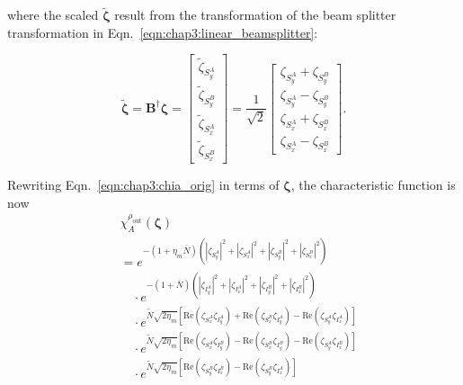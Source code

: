 \documentclass[aps,twocolumn,secnumarabic,amsmath,amssymb,pra,groupedaddress,
showpacs, showkeys,draft]{revtex4-1}
\newcommand{\pna}[1]{\left(#1\right)}
\newcommand{\pnb}[1]{\left[#1\right]}
\newcommand{\eqn}[1]{
\begin{equation}
	#1
\end{equation}
}
\begin{document}
where the scaled $\tilde{\bm{\zeta}}$ result from the transformation of the
beam splitter transformation in Eqn.~\ref{eqn:chap3:linear_beamsplitter}:
\eqn{
\tilde{\bm{\zeta}}=\mathbf{B}^{\dagger}\bm{\zeta}=\left[
\begin{array}{c}
	\tilde{\zeta}_{S_y^A} \\
	\tilde{\zeta}_{S_y^B} \\
	\tilde{\zeta}_{S_x^A} \\
	\tilde{\zeta}_{S_x^B}
\end{array}
\right]=\frac{1}{\sqrt{2}}
\left[
\begin{array}{c}
	\zeta_{S_y^A} + \zeta_{S_y^B} \\
	\zeta_{S_y^A} - \zeta_{S_y^B} \\
	\zeta_{S_x^A} + \zeta_{S_x^B}\\
	\zeta_{S_x^A} - \zeta_{S_x^B}
\end{array}
\right].\label{eq:scaled_vars}
}
Rewriting Eqn.~\ref{eqn:chap3:chia_orig} in terms of $\bm{\zeta}$, the
characteristic function is now
\begin{align}
  & \chi_A^{\rho_{\textrm{out}}}\pna{\bm{\zeta}} \nonumber \\
&  = e^{-\pna{1+\eta_{m}\bar{N}}\pna{|\zeta_{S_y^A}|^2+|\zeta_{S_x^A}|^2+|\zeta_{S_y^B}|^2+|\zeta_{S_x^B}|^2}}
  \nonumber \\
&  \quad\cdot
e^{-\pna{1+\bar{N}}\pna{|\zeta_{I_y^A}|^2+|\zeta_{I_x^A}|^2+|\zeta_{I_y^B}|^2+|\zeta_{I_x^B}|^2}}
\nonumber \\
&  \quad\cdot e^{\tilde{N}\sqrt{2\eta_{m}}\pnb{\textrm{Re}\pna{\zeta_{S_x^A} \zeta_{I_y^A}}
    +\textrm{Re}\pna{\zeta_{S_x^B}\zeta_{I_y^A}}
    -\textrm{Re}\pna{\zeta_{S_y^A}\zeta_{I_x^A}}}}\nonumber \\
&  \quad\cdot e^{\tilde{N}\sqrt{2\eta_{m}}\pnb{\textrm{Re}\pna{\zeta_{S_x^A}\zeta_{I_y^B}}
    -\textrm{Re}\pna{\zeta_{S_x^B}\zeta_{I_y^B}}
    -\textrm{Re}\pna{\zeta_{S_y^A}\zeta_{I_x^B}}}} \nonumber \\
&  \quad\cdot e^{\tilde{N}\sqrt{2\eta_{m}}\pnb{\textrm{Re}\pna{\zeta_{S_y^B} \zeta_{I_x^B}}-\textrm{Re}\pna{\zeta_{S_y^B} \zeta_{I_x^A}}}} 
\label{eq:char_final}
\end{align}
\end{document}
